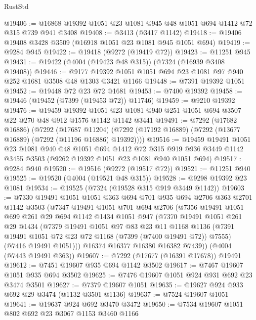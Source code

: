 \begin{lexlean}{RustStd}
\begin{coremodule}
@19406 := @16868 @19392 @1051 @23 @1081 @945 @48 @1051 @694 @1412 @72 @315 @739 @941 @3408
@19408 := @3413 (@3417 @1142)
@19418 := @19406 @19408 @3428 @3509 (@16918 @1051 @23 @1081 @945 @1051 @694)
@19419 := @9284 @945
@19422 := @19418 (@9272 (@19419 @72))
@19423 := @11251 @945
@19431 := @19422 (@4004 (@19423 @48 @315)) (@7324 (@16939 @3408 @19408))
@19446 := @9177 @19392 @1051 @1051 @694 @23 @1081 @97 @940 @252 @1681 @3508 @48 @1303 @3421 @1166
@19448 := @7391 @19392 @1051
@19452 := @19448 @72 @23 @72 @1681
@19453 := @7400 @19392
@19458 := @19446 (@19452 (@7399 (@19453 @72)) @11746)
@19459 := @9210 @19392
@19476 := @19459
    @19392
    @1051
    @23
    @1081
    @940
    @251
    @1051
    @694
    @3507
    @22
    @270
    @48
    @912
    @1576
    @1142
    @1142
    @3441
@19491 := @7292
    (@17682 @16886)
    (@7292
      (@17687 @11204)
      (@7292 (@17192 @16889) (@7292 (@13677 @16889) (@7292 (@11196 @16886) @19392))))
@19516 := @19459
    @19491
    @1051
    @23
    @1081
    @940
    @48
    @1051
    @694
    @1412
    @72
    @315
    @919
    @936
    @3449
    @1142
    @3455
    @3503
    (@9262 @19392 @1051 @23 @1081 @940 @1051 @694)
@19517 := @9284 @940
@19520 := @19516 (@9272 (@19517 @72))
@19521 := @11251 @940
@19525 := @19520 (@4004 (@19521 @48 @315))
@19528 := @9298 @19392 @23 @1081
@19534 := @19525 (@7324 (@19528 @315 @919 @3449 @1142))
@19603 := @7330
    @19491
    @1051
    @1051
    @363
    @694
    @701
    @935
    @694
    @2706
    @363
    @2701
    @1142
    @3503
    (@7347
      @19491
      @1051
      @701
      @694
      @2706
      (@7356
        @19491
        @1051
        @699
        @261
        @29
        @694
        @1142
        @1434
        @1051
        @947
        (@7370
          @19491
          @1051
          @261
          @29
          @1434
          (@7379
            @19491
            @1051
            @97
            @83
            @23
            @11
            @1168
            @1136
            (@7391 @19491 @1051 @72 @23 @72 @1168 (@7399 (@7400 @19491 @72)) @7555)
            (@7416 @19491 @1051)))
        @16374
        @16377
        @16380
        @16382
        @7439))
    (@4004 (@7443 @19491 @363))
@19607 := @7292 (@17677 (@16391 @17678)) @19491
@19612 := @7451 @19607 @935 @694 @1142 @3502
@19617 := @7467 @19607 @1051 @935 @694 @3502
@19625 := @7476 @19607 @1051 @924 @931 @692 @23 @3474 @3501
@19627 := @7379 @19607 @1051
@19635 := @19627 @924 @933 @692 @29 @3474 (@1132 @3501 @1136)
@19637 := @7524 @19607 @1051
@19641 := @19637 @924 @692 @3470 @3472
@19650 := @7534 @19607 @1051 @802 @692 @23 @3067 @1153 @3460 @1166

\end{coremodule}
\end{lexlean}
